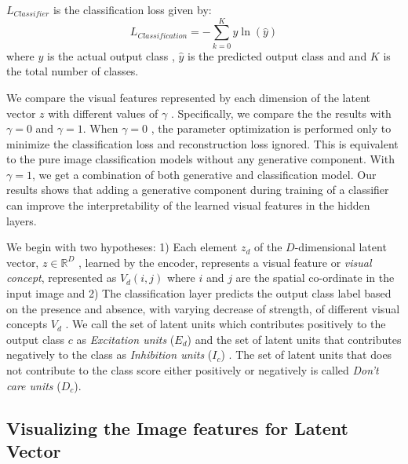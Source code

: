 \documentclass[pdflatex,referee,lineno]{sn-jnl}
\theoremstyle{thmstyleone}
\theoremstyle{thmstyletwo}
\theoremstyle{thmstylethree}
\begin{document}
 $L_{Classifier }$ is the classification loss given by:
\begin{equation} \label{semi_supervised_loss}
L_{Classification} =  -\sum_{k=0}^{K}y\ln(\hat{y})
\end{equation}
where  $y$ is the actual output class , $\hat{y}$  is the predicted output class and and $K$ is the total number of classes.

We  compare the visual features represented by each dimension of the latent vector $z$  with different values of $\gamma$ . Specifically, we  compare the the results with $\gamma=0$  and $\gamma=1$. When $\gamma=0$ , the parameter optimization is performed only to minimize the classification loss and reconstruction loss ignored. This is equivalent to the pure image classification models without any generative component. With $\gamma=1$, we get a combination of both generative and classification model.  Our results shows that adding a generative component during training of a classifier can improve the interpretability of the learned visual features in the hidden layers.

We begin with two  hypotheses: 1) Each element $z_d$ of the  $D$-dimensional latent vector, $z\in \mathbb{R}^D$ , learned by the encoder,  represents a visual feature  or \textit{visual concept},  represented as $V_d(i,j)$  where $i$ and $j$ are the spatial co-ordinate in the input image and 2) The classification layer predicts the output class label  based on  the presence and absence, with varying decrease of strength,   of different visual concepts $V_d$ . We call the set of  latent units which contributes positively  to the output class  $c$  as \textit{Excitation units} ($E_d$) and the set of latent units that contributes negatively to the class   as \textit{Inhibition units} ($I_c$) . The set of  latent units that does not contribute to the class score either positively or negatively  is called \textit{Don't care units} ($D_c$).

\subsection{Visualizing  the Image features for Latent Vector}
\end{document}

